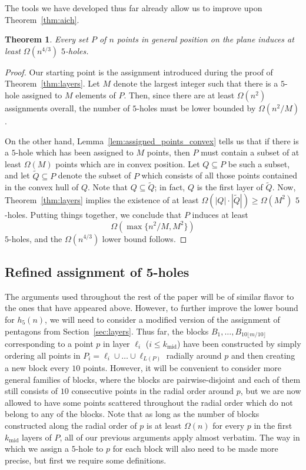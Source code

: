 \documentclass[12pt,reqno, a4paper]{amsart}
\newcounter{contSect} \numberwithin{contSect}{section}
\newtheorem{theorem}[contSect]{Theorem}
\begin{document}
The tools we have developed thus far already allow us to improve upon Theorem~\ref{thm:aich}.

\begin{theorem}\label{thm:preliminary_bound}
    Every set $P$ of $n$ points in general position on the plane induces at least $\Omega(n^{4/3})$ $5$-holes.
\end{theorem}

\begin{proof}
    Our starting point is the assignment introduced during the proof of Theorem~\ref{thm:layers}. Let $M$ denote the largest integer such that there is a $5$-hole assigned to $M$ elements of $P$. Then, since there are at least $\Omega(n^2)$ assignments overall, the number of $5$-holes must be lower bounded by $\Omega(n^2/M)$. 
    
    On the other hand, Lemma~\ref{lem:assigned_points_convex} tells us that if there is a $5$-hole which has been assigned to $M$ points, then $P$ must contain a subset of at least $\Omega(M)$ points which are in convex position. Let $Q\subseteq P$ be such a subset, and let $\widetilde Q\subseteq P$ denote the subset of $P$ which consists of all those points contained in the convex hull of $Q$. Note that $Q\subseteq \widetilde Q$; in fact, $Q$ is the first layer of $\widetilde Q$. Now, Theorem~\ref{thm:layers} implies the existence of at least $\Omega(|Q|\cdot|\widetilde Q|)\geq\Omega(M^2)$ $5$-holes. Putting things together, we conclude that $P$ induces at least \[\Omega\left(\max\{n^2/M,M^2\}\right)\] $5$-holes, and the $\Omega(n^{4/3})$ lower bound follows.
\end{proof}

\subsection*{Refined assignment of 5-holes} The arguments used throughout the rest of the paper will be of similar flavor to the ones that have appeared above. However, to further improve the lower bound for $h_5(n)$, we will need to consider a modified version of the assignment of pentagons from Section~\ref{sec:layers}. Thus far, the blocks $B_1,\dots,B_{10\lfloor m/10\rfloor}$ corresponding to a point $p$ in layer $\ell_i$ ($i\leq k_{\operatorname{mid}}$) have been constructed by simply ordering all points in $P_i=\ell_i\cup\dots\cup\ell_{L(P)}$ radially around $p$ and then creating a new block every $10$ points. However, it will be convenient to consider more general families of blocks, where the blocks are pairwise-disjoint and each of them still consists of $10$ consecutive points in the radial order around $p$, but we are now allowed to have some points scattered throughout the radial order which do not belong to any of the blocks. Note that as long as the number of blocks constructed along the radial order of $p$ is at least $\Omega(n)$ for every $p$ in the first $k_{\operatorname{mid}}$ layers of $P$, all of our previous arguments apply almost verbatim. The way in which we assign a $5$-hole to $p$ for each block will also need to be made more precise, but first we require some definitions.
\end{document}
